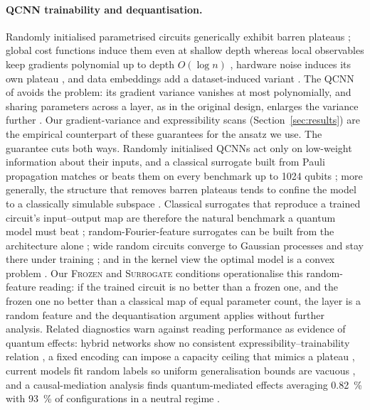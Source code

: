 \paragraph{QCNN trainability and dequantisation.}
Randomly initialised parametrised circuits generically exhibit barren
plateaus \citep{mcclean2018barren,larocca2024barren}; global cost functions
induce them even at shallow depth whereas local observables keep gradients
polynomial up to depth $O(\log n)$ \citep{cerezo2021cost}, hardware noise
induces its own plateau \citep{wang2021noise}, and data embeddings add a
dataset-induced variant \citep{thanasilp2021subtleties}. The QCNN of
\citet{cong2019quantum} avoids the problem: its gradient variance vanishes at
most polynomially, and sharing parameters across a layer, as in the original
design, enlarges the variance further \citep{pesah2020absence}. Our
gradient-variance and expressibility scans (Section~\ref{sec:results}) are the
empirical counterpart of these guarantees for the ansatz we use. The guarantee
cuts both ways. Randomly initialised QCNNs act only on low-weight information
about their inputs, and a classical surrogate built from Pauli propagation
matches or beats them on every benchmark up to 1024 qubits
\citep{bermejo2024quantum}; more generally, the structure that removes barren
plateaus tends to confine the model to a classically simulable subspace
\citep{cerezo2023provable}. Classical surrogates that reproduce a trained
circuit's input--output map are therefore the natural benchmark a quantum model
must beat \citep{schreiber2022classical}; random-Fourier-feature surrogates can
be built from the architecture alone \citep{landman2022classically}; wide
random circuits converge to Gaussian processes and stay there under training
\citep{girardi2024trained}; and in the kernel view the optimal model is a convex
problem \citep{schuld2021quantum}. Our \textsc{Frozen} and \textsc{Surrogate}
conditions operationalise this random-feature reading: if the trained circuit
is no better than a frozen one, and the frozen one no better than a classical
map of equal parameter count, the layer is a random feature and the
dequantisation argument applies without further analysis. Related diagnostics
warn against reading performance as evidence of quantum effects: hybrid
networks show no consistent expressibility--trainability relation
\citep{kashif2026rethinking}, a fixed encoding can impose a capacity ceiling
that mimics a plateau \citep{pandey2026architectural}, current models fit random
labels so uniform generalisation bounds are vacuous
\citep{gilfuster2023understanding}, and a causal-mediation analysis finds
quantum-mediated effects averaging \SI{0.82}{\percent} with \SI{93}{\percent} of
configurations in a neutral regime \citep{kesiku2026quantum}.

